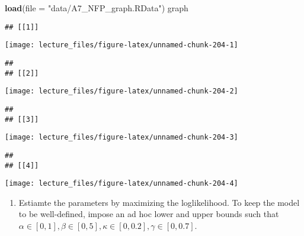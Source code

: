 \documentclass[
]{book}
\newenvironment{Shaded}{\begin{snugshade}}{\end{snugshade}}
\newcommand{\DataTypeTok}[1]{\textcolor[rgb]{0.13,0.29,0.53}{#1}}
\newcommand{\KeywordTok}[1]{\textcolor[rgb]{0.13,0.29,0.53}{\textbf{#1}}}
\newcommand{\NormalTok}[1]{#1}
\newcommand{\StringTok}[1]{\textcolor[rgb]{0.31,0.60,0.02}{#1}}
\providecommand{\tightlist}{%
  \setlength{\itemsep}{0pt}\setlength{\parskip}{0pt}}
\begin{document}
\begin{Shaded}
\begin{Highlighting}[]
\KeywordTok{load}\NormalTok{(}\DataTypeTok{file =} \StringTok{"data/A7_NFP_graph.RData"}\NormalTok{)}
\NormalTok{graph}
\end{Highlighting}
\end{Shaded}

\begin{verbatim}
## [[1]]
\end{verbatim}

\begin{center}\texttt{[image: lecture\_files/figure-latex/unnamed-chunk-204-1]} \end{center}

\begin{verbatim}
## 
## [[2]]
\end{verbatim}

\begin{center}\texttt{[image: lecture\_files/figure-latex/unnamed-chunk-204-2]} \end{center}

\begin{verbatim}
## 
## [[3]]
\end{verbatim}

\begin{center}\texttt{[image: lecture\_files/figure-latex/unnamed-chunk-204-3]} \end{center}

\begin{verbatim}
## 
## [[4]]
\end{verbatim}

\begin{center}\texttt{[image: lecture\_files/figure-latex/unnamed-chunk-204-4]} \end{center}

\begin{enumerate}
\def\labelenumi{\arabic{enumi}.}
\setcounter{enumi}{3}
\tightlist
\item
  Estiamte the parameters by maximizing the loglikelihood. To keep the model to be well-defined, impose an ad hoc lower and upper bounds such that \(\alpha \in [0, 1], \beta \in [0, 5], \kappa \in [0, 0.2], \gamma \in [0, 0.7]\).
\end{enumerate}
\end{document}
